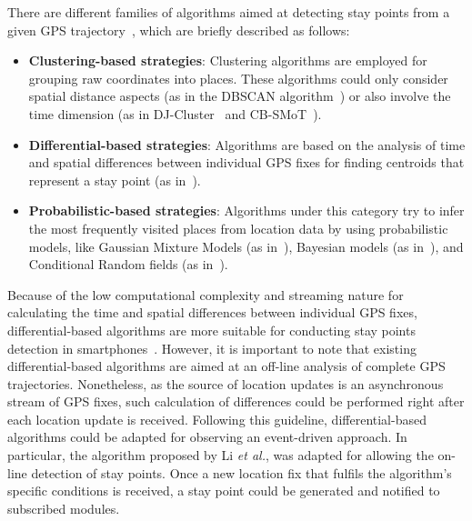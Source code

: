 \documentclass[ENG,PhD]{cinvestav}
\begin{document}
There are different families of algorithms aimed at detecting stay points from a given GPS trajectory~\cite{Lee2013a}, which are briefly described as follows:
\begin{itemize}
  \item \textbf{Clustering-based strategies}: Clustering algorithms are employed for grouping raw coordinates into places.
  These algorithms could only consider spatial distance aspects (as in the DBSCAN algorithm~\cite{Ester1996}) or also involve the time dimension (as in DJ-Cluster~\cite{Zhou2007} and CB-SMoT~\cite{Palma2008}).
  \item \textbf{Differential-based strategies}: Algorithms are based on the analysis of time and spatial differences between individual GPS fixes for finding centroids that represent a stay point (as in~\cite{Kang2005,Hu2007,Li2008,Ye2009}).
  \item \textbf{Probabilistic-based strategies}: Algorithms under this category try to infer the most frequently visited places from location data by using probabilistic models, like Gaussian Mixture Models (as in~\cite{Zhang2007}), Bayesian models (as in~\cite{Nurmi2008}), and Conditional Random fields (as in~\cite{Liao2013}).
\end{itemize}

Because of the low computational complexity and streaming nature for calculating the time and spatial differences between individual GPS fixes, differential-based algorithms are more suitable for conducting stay points detection in smartphones~\cite{Lee2013a}.
However, it is important to note that existing differential-based algorithms are aimed at an off-line analysis of complete GPS trajectories.
Nonetheless, as the source of location updates is an asynchronous stream of GPS fixes, such calculation of differences could be performed right after each location update is received.
Following this guideline, differential-based algorithms could be adapted for observing an event-driven approach.
In particular, the algorithm proposed by Li \emph{et al.}, was adapted for allowing the on-line detection of stay points.
Once a new location fix that fulfils the algorithm's specific conditions is received, a stay point could be generated and notified to subscribed modules.
\end{document}
